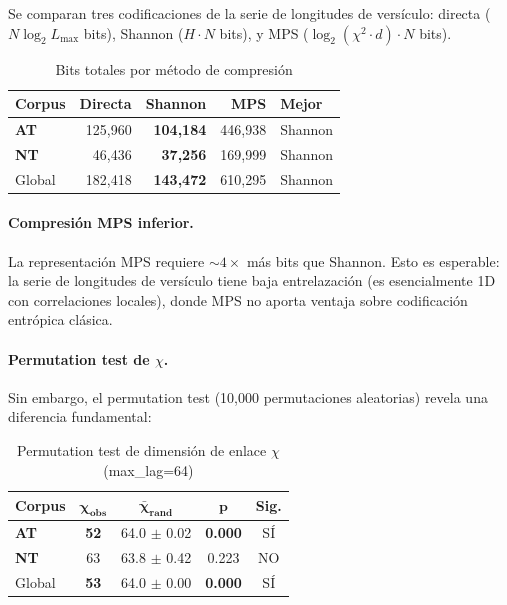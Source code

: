 \documentclass[12pt,a4paper]{article}
\newcommand{\ot}{\textcolor{otcolor}{\textbf{AT}}}
\newcommand{\nt}{\textcolor{ntcolor}{\textbf{NT}}}
\newcommand{\val}[1]{\textcolor{hlcolor}{\textbf{#1}}}
\begin{document}
Se comparan tres codificaciones de la serie de longitudes de vers\'iculo:
directa ($N \log_2 L_{\max}$ bits), Shannon ($H \cdot N$ bits), y MPS
($\log_2(\chi^2 \cdot d) \cdot N$ bits).

\begin{table}[H]
\centering
\caption{Bits totales por m\'etodo de compresi\'on}
\label{tab:compression}
\begin{tabular}{lrrrl}
\toprule
\textbf{Corpus} & \textbf{Directa} & \textbf{Shannon} & \textbf{MPS} & \textbf{Mejor} \\
\midrule
\ot{}    & 125,960 & \val{104,184} & 446,938 & Shannon \\
\nt{}    &  46,436 & \val{37,256}  & 169,999 & Shannon \\
Global   & 182,418 & \val{143,472} & 610,295 & Shannon \\
\bottomrule
\end{tabular}
\end{table}

\paragraph{Compresi\'on MPS inferior.}
La representaci\'on MPS requiere $\sim 4\times$ m\'as bits que Shannon.
Esto es esperable: la serie de longitudes de vers\'iculo tiene baja entrelazaci\'on
(es esencialmente 1D con correlaciones locales), donde MPS no aporta ventaja
sobre codificaci\'on entr\'opica cl\'asica.

\paragraph{Permutation test de $\chi$.}
Sin embargo, el permutation test (10,000 permutaciones aleatorias) revela una
diferencia fundamental:

\begin{table}[H]
\centering
\caption{Permutation test de dimensi\'on de enlace $\chi$ (max\_lag=64)}
\label{tab:permchi}
\begin{tabular}{lcccc}
\toprule
\textbf{Corpus} & $\boldsymbol{\chi_{\text{obs}}}$ & $\boldsymbol{\bar{\chi}_{\text{rand}}}$ & $\boldsymbol{p}$ & \textbf{Sig.} \\
\midrule
\ot{}    & \val{52} & 64.0 $\pm$ 0.02 & \val{0.000} & S\'I \\
\nt{}    & 63 & 63.8 $\pm$ 0.42 & 0.223 & NO \\
Global   & \val{53} & 64.0 $\pm$ 0.00 & \val{0.000} & S\'I \\
\bottomrule
\end{tabular}
\end{table}
\end{document}
